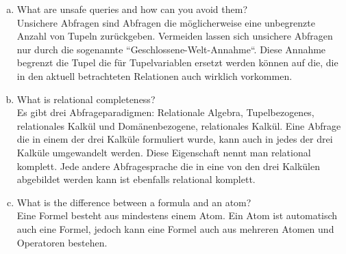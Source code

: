 \documentclass[11pt,a4paper,DIV=9]{scrartcl}
\begin{document}
\begin{enumerate}[a)]
 \item What are unsafe queries and how can you avoid them? \\
 Unsichere Abfragen sind Abfragen die m\"oglicherweise eine unbegrenzte Anzahl von Tupeln zur\"uckgeben. Vermeiden lassen sich unsichere Abfragen nur durch die sogenannte ``Geschlossene-Welt-Annahme``. Diese Annahme begrenzt die Tupel die f\"ur Tupelvariablen ersetzt werden k\"onnen auf die, die in den aktuell betrachteten Relationen auch wirklich vorkommen.
 \item What is relational completeness? \\
 Es gibt drei Abfrageparadigmen: Relationale Algebra, Tupelbezogenes, relationales Kalk\"ul und Dom\"anenbezogene, relationales Kalk\"ul. Eine Abfrage die in einem der drei Kalk\"ule formuliert wurde, kann auch in jedes der drei Kalk\"ule umgewandelt werden. Diese Eigenschaft nennt man relational komplett. Jede andere Abfragesprache die in eine von den drei Kalk\"ulen abgebildet werden kann ist ebenfalls relational komplett.
 \item What is the difference between a formula and an atom? \\
 Eine Formel besteht aus mindestens einem Atom. Ein Atom ist automatisch auch eine Formel, jedoch kann eine Formel auch aus mehreren Atomen und Operatoren bestehen.
\end{enumerate}
\end{document}
